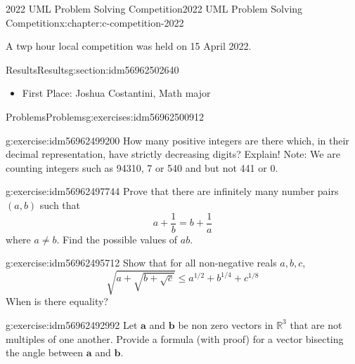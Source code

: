 \documentclass[twoside,10pt,]{book}
\numberwithin{equation}{section}
\newcommand{\RR}{\mathbb{R}}
\renewcommand{\vec}[1]{\mathbf{#1}}
\begin{document}
\begin{chapterptx}{2022 UML Problem Solving Competition}{}{2022 UML Problem Solving Competition}{}{}{x:chapter:c-competition-2022}
\begin{introduction}{}%
A twp hour local competition was held on 15 April 2022.%
\end{introduction}%
%
%
\typeout{************************************************}
\typeout{************************************************}
%
\begin{sectionptx}{Results}{}{Results}{}{}{g:section:idm56962502640}
%
\begin{itemize}[label=\textbullet]
\item{}First Place:  Joshua Costantini, Math major%
\end{itemize}
%
\end{sectionptx}
%
%
\typeout{************************************************}
\typeout{************************************************}
%
\begin{exercises-section}{Problems}{}{Problems}{}{}{g:exercises:idm56962500912}
\begin{divisionexercise}{1}{}{}{g:exercise:idm56962499200}%
How many positive integers are there which, in their decimal representation, have strictly decreasing digits? Explain!  Note:  We are counting integers such as  94310, 7 or 540 and but not 441 or 0.%
\end{divisionexercise}%
\begin{divisionexercise}{2}{}{}{g:exercise:idm56962497744}%
Prove that there are infinitely many number pairs \((a,b)\) such that%
\begin{equation*}
a+\frac{1}{b}=b+\frac{1}{a}
\end{equation*}
where \(a\neq b\). Find the possible values of \(ab\).%
\end{divisionexercise}%
\begin{divisionexercise}{3}{}{}{g:exercise:idm56962495712}%
Show that for all non-negative reals \(a, b, c\),%
\begin{equation*}
\sqrt{a + \sqrt{b + \sqrt{c}}} \leq a^{1/2}+ b^{1/4} + c^{1/8}
\end{equation*}
When is there equality?%
\end{divisionexercise}%
\begin{divisionexercise}{4}{}{}{g:exercise:idm56962492992}%
Let \(\vec{a}\) and  \(\vec{b}\)  be non zero vectors in \(\RR^3\) that are not multiples of one another. Provide a formula (with proof) for a vector bisecting the angle between \(\vec{a}\) and \(\vec{b}\).%

\end{divisionexercise}
\end{exercises-section}
\end{chapterptx}
\end{document}
